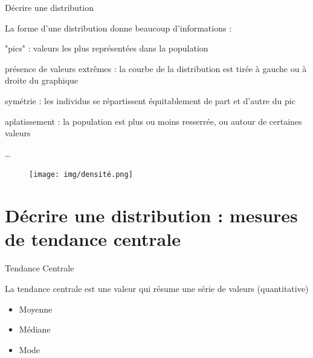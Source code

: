 \documentclass{beamer}
\begin{document}
\begin{frame}{Décrire une distribution}


La forme d'une distribution donne beaucoup d'informations  : 

\begin{small}
\begin{itemize}
  \setlength\itemsep{-0.0em}
  \begin{spacing}{0.7}
 \item \alert{"pics"} : valeurs les plus représentées dans la population 
 \item présence de \alert{valeurs extrêmes} : la courbe de la distribution est tirée à gauche ou à droite du graphique
 \item \alert{symétrie} : les individus se répartissent équitablement de part et d'autre du pic  
 \item \alert{aplatissement} : la population est plus ou moins resserrée, ou  autour de certaines valeurs 
 \item \dots
 \end{spacing}
\end{itemize}
\end{small}

\begin{figure}
  \centering
     \texttt{[image: img/densité.png]}
\end{figure}



\end{frame}


\section{Décrire une distribution : mesures de \alert{tendance centrale}}

\begin{frame}{Tendance Centrale}


La tendance centrale est \alert{une} valeur qui \alert{résume} une série de valeurs (quantitative)

\vspace{1cm}


\begin{itemize}
  \item Moyenne
  \item Médiane 
  \item Mode
\end{itemize}


\end{frame}
\end{document}
